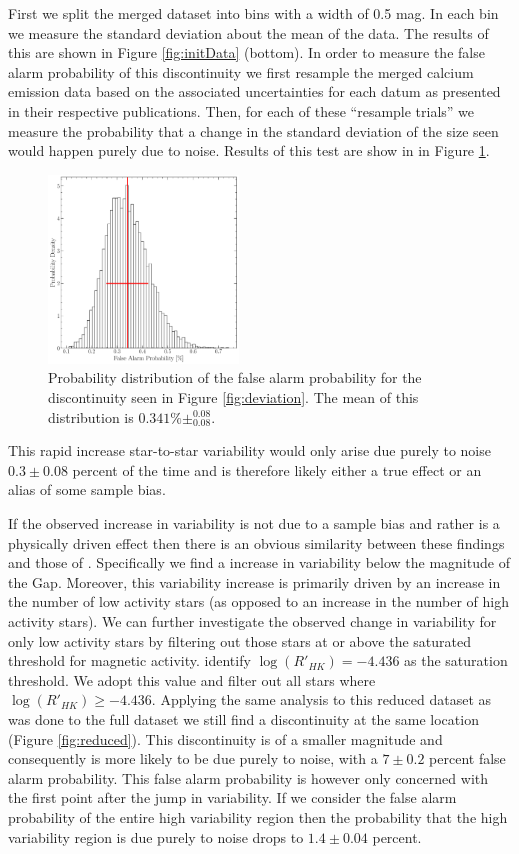 First we split the merged dataset into bins with a width of 0.5 mag. In each bin we
measure the standard deviation about the mean of the data. The results of this
are shown in Figure \ref{fig:initData} (bottom). In order to measure the false alarm
probability of this discontinuity we first resample the merged calcium
emission data based on the associated uncertainties for each datum as
presented in their respective publications. Then, for each of these ``resample
trials'' we measure the probability that a change in the standard deviation of
the size seen would happen purely due to noise. Results of this test are show in
in Figure \ref{fig:dist}. 

\begin{figure}
  \centering
  \includegraphics[width=0.45\textwidth]{figures/fpDist.pdf}
  \caption{Probability distribution of the false alarm probability for the
  discontinuity seen in Figure \ref{fig:deviation}. The mean of this
  distribution is $0.341\%\pm^{0.08}_{0.08}$.}
  \label{fig:dist}
\end{figure}

This rapid increase star-to-star variability would only arise due purely to
noise $0.3\pm0.08$ percent of the time and is therefore likely either a true
effect or an alias of some sample bias.

If the observed increase in variability is not due to a sample bias and rather
is a physically driven effect then there is an obvious similarity between these
findings and those of \citet{Jao2023}. Specifically we find a increase in
variability below the magnitude of the Gap. Moreover, this variability
increase is primarily driven by an increase in the number of low activity stars
(as opposed to an increase in the number of high activity stars). We can
further investigate the observed change in variability for only low activity
stars by filtering out those stars at or above the saturated threshold for
magnetic activity. \citet{Boudreaux2022} identify $\log(R'_{HK}) = -4.436$ as
the saturation threshold. We adopt this value and filter out all stars where
$\log(R'_{HK}) \geq -4.436$. Applying the same analysis to this reduced dataset
as was done to the full dataset we still find a discontinuity at the same
location (Figure \ref{fig:reduced}). This discontinuity is of a smaller
magnitude and consequently is more likely to be due purely to noise, with a
$7\pm0.2$ percent false alarm probability. This false alarm probability is
however only concerned with the first point after the jump in variability. If
we consider the false alarm probability of the entire high variability region
then the probability that the high variability region is due purely to noise
drops to $1.4\pm0.04$ percent.

